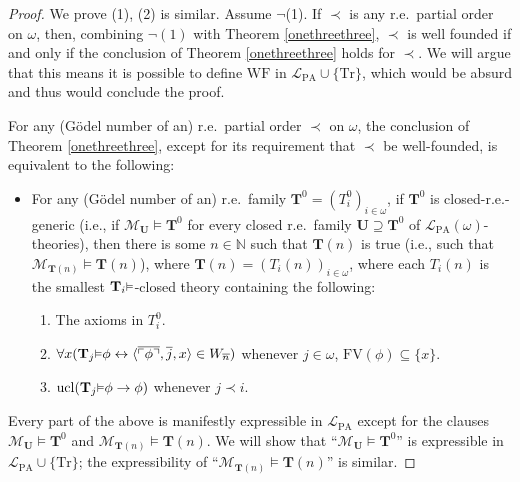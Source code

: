 \documentclass[reqno]{article}
\theoremstyle{definition}
\def\L{\mathscr{L}}
\def\M{\mathscr{M}}
\def\T{\mathbf{T}}
\def\U{\mathbf{U}}
\def\FV{\mathrm{FV}}
\def\LPA{\L_{\mathrm{PA}}}
\def\Tr{\mathrm{Tr}}
\renewcommand{\Pr}[1]{\T_{#1}\mbox{\small${\vDash}$}}
\newcommand{\ucl}[1]{\mathrm{ucl}(#1)}
\begin{document}
\begin{proof}
We prove (1), (2) is similar.
Assume $\neg$(1).  If $\prec$ is any r.e.~partial order on $\omega$,
then, combining $\neg(1)$ with Theorem \ref{onethreethree},
$\prec$ is well founded if and only if the conclusion of Theorem \ref{onethreethree} holds for $\prec$.
We will argue that this means it is possible to define $\mathrm{WF}$ in
$\LPA\cup\{\Tr\}$, which would be absurd and thus would conclude the proof.

For any (G\"odel number of an) r.e.\ partial order $\prec$
on $\omega$, the conclusion of Theorem \ref{onethreethree}, except for its requirement
that $\prec$ be well-founded, is equivalent to the following:
\begin{itemize}
    \item
    For any (G\"odel number of an) r.e.\ family $\T^0=(T^0_i)_{i\in\omega}$,
    if $\T^0$ is closed-r.e.-generic
    (i.e., if $\M_\U\models\T^0$ for every closed r.e.\ family $\U\supseteq\T^0$
    of $\LPA(\omega)$-theories), then there is some $n\in\mathbb N$
    such that $\T(n)$ is true
    (i.e., such that $\M_{\T(n)}\models\T(n)$), where
    $\T(n)=(T_i(n))_{i\in\omega}$, where each $T_i(n)$ is the smallest
    $\Pr i$-closed theory containing the following:
    \begin{enumerate}
        \item
        The axioms in $T^0_i$.
        \item
        $\forall x (\Pr j \phi \leftrightarrow \langle \overline{\ulcorner \phi\urcorner},
        \overline j, x\rangle\in W_{\overline n})$ whenever $j\in\omega$,
        $\FV(\phi)\subseteq\{x\}$.
        \item
        $\ucl{\Pr j \phi\rightarrow\phi}$ whenever $j\prec i$.
    \end{enumerate}
\end{itemize}
Every part of the above is manifestly expressible in $\LPA$ except for the clauses
$\M_\U\models \T^0$ and $\M_{\T(n)}\models \T(n)$.
We will show that ``$\M_\U\models \T^0$'' is expressible in $\LPA\cup\{\Tr\}$;
the expressibility of ``$\M_{\T(n)}\models \T(n)$'' is similar.


\end{proof}
\end{document}
